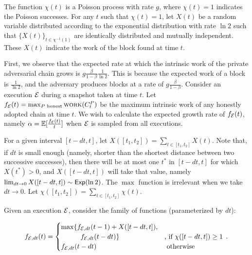 The function $\chi(t)$ is a Poisson process with rate $g$, where $\chi(t) = 1$
indicates the Poisson successes. For any $t$ such that $\chi(t) = 1$, let $X(t)$ be a
random variable distributed according to the exponential distribution with rate $\ln2$
such that $\{ X(t) \}_{t \in \chi^{-1}(1)}$ are identically distributed and mutually
independent. These $X(t)$ indicate the work of the block found at time $t$.

First, we observe that the expected rate at which the intrinsic work of the private adversarial
chain grows is $g \frac{\beta}{1 - \beta} \frac{1}{\ln2}$. This is because the expected work of a
block is $\frac{1}{\ln2}$, and the adversary produces blocks at a rate of $g \frac{\beta}{1 - \beta}$.
Consider an execution $\mathcal{E}$ during a snapshot taken at time $t$. Let
$f_{\mathcal{E}}(t) = \max_{P \text{ honest}}{\textsc{work}(C^P_t)}$ be the maximum intrinsic work of any honestly
adopted chain at time $t$. We wish to calculate the expected growth rate of $f_{\mathcal{E}}(t)$, namely
$\alpha = \mathop{{}\mathbb{E}}[\frac{f_{\mathcal{E}}(t)}{t}]$ when $\mathcal{E}$ is sampled from all executions.

For a given interval $[t - dt, t]$, let $X([t_1, t_2]) = \sum_{t \in [t_1, t_2]} X(t)$. Note that, if
$dt$ is small enough (namely, shorter than the shortest distance between two successive successes),
then there will be at most one $t^*$ in $[t - dt, t]$ for which $X(t^*) > 0$, and $X([t - dt, t])$
will take that value, namely $\lim_{dt \to 0} X([t - dt, t]) \sim \textsf{Exp}(\ln2)$.
The $\max$ function is irrelevant when we take $dt \to 0$.
Let $\chi([t_1, t_2]) = \sum_{t \in [t_1, t_2]} \chi(t)$.

Given an execution $\mathcal{E}$, consider the family of functions (parameterized by $dt$):

\[
  f_{\Epsilon,dt}(t) = \begin{cases}
             \max\{f_{\Epsilon,dt}(t - 1) + X([t - dt, t]),&\\
    \phantom{\max\{\}}      f_{\Epsilon,dt}(t - dt)\} & \text{, if } \chi([t - dt, t]) \geq 1\\
          f_{\Epsilon,dt}(t - dt) & \text{ otherwise }
  \end{cases}\,.
\]

